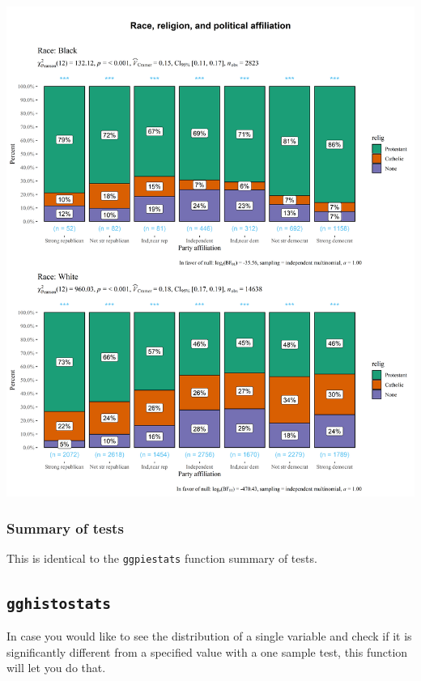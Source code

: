 \documentclass[
]{article}
\begin{document}
\includegraphics[width=1\linewidth]{./figures/paper-ggbarstats2-1}

\hypertarget{summary-of-tests-4}{%
\subsubsection{Summary of tests}\label{summary-of-tests-4}}

This is identical to the \texttt{ggpiestats} function summary of tests.

\hypertarget{gghistostats}{%
\subsection{\texorpdfstring{\texttt{gghistostats}}{gghistostats}}\label{gghistostats}}

In case you would like to see the distribution of a single variable and check if
it is significantly different from a specified value with a one sample test,
this function will let you do that.
\end{document}
